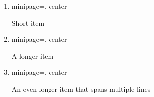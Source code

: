 \documentclass{beamer}
\newcommand{\adjustedbox}[1]{%
  \begin{adjustbox}{minipage=\linewidth, center}
    \begin{tcolorbox}[mybox]
      #1
    \end{tcolorbox}%
  \end{adjustbox}%
}
\begin{document}
\begin{frame}
  \begin{enumerate}[label=\arabic*.]
    \item \adjustedbox{Short item}
    \item \adjustedbox{A longer item}
    \item \adjustedbox{An even longer item that spans multiple lines}
  \end{enumerate}
\end{frame}
\end{document}

